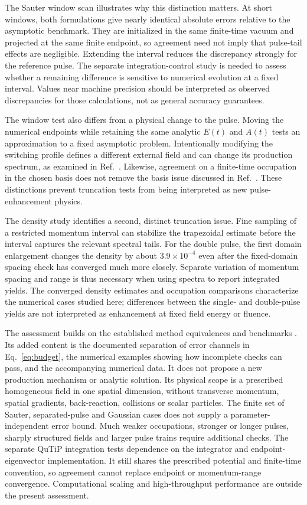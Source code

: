 \documentclass[11pt,a4paper]{article}
\begin{document}
The Sauter window scan illustrates why this distinction matters. At short windows, both formulations give nearly identical absolute errors relative to the asymptotic benchmark. They are initialized in the same finite-time vacuum and projected at the same finite endpoint, so agreement need not imply that pulse-tail effects are negligible. Extending the interval reduces the discrepancy strongly for the reference pulse. The separate integration-control study is needed to assess whether a remaining difference is sensitive to numerical evolution at a fixed interval. Values near machine precision should be interpreted as observed discrepancies for those calculations, not as general accuracy guarantees.

The window test also differs from a physical change to the pulse. Moving the numerical endpoints while retaining the same analytic $E(t)$ and $A(t)$ tests an approximation to a fixed asymptotic problem. Intentionally modifying the switching profile defines a different external field and can change its production spectrum, as examined in Ref.~\cite{Aleksandrov2025}. Likewise, agreement on a finite-time occupation in the chosen basis does not remove the basis issue discussed in Ref.~\cite{Dabrowski2016}. These distinctions prevent truncation tests from being interpreted as new pulse-enhancement physics.

The density study identifies a second, distinct truncation issue. Fine sampling of a restricted momentum interval can stabilize the trapezoidal estimate before the interval captures the relevant spectral tails. For the double pulse, the first domain enlargement changes the density by about $3.9\times10^{-4}$ even after the fixed-domain spacing check has converged much more closely. Separate variation of momentum spacing and range is thus necessary when using spectra to report integrated yields. The converged density estimates and occupation comparisons characterize the numerical cases studied here; differences between the single- and double-pulse yields are not interpreted as enhancement at fixed field energy or fluence.

The assessment builds on the established method equivalences and benchmarks \cite{Dumlu2009,Hebenstreit2010,LiGong2021}. Its added content is the documented separation of error channels in Eq.~\eqref{eq:budget}, the numerical examples showing how incomplete checks can pass, and the accompanying numerical data. It does not propose a new production mechanism or analytic solution. Its physical scope is a prescribed homogeneous field in one spatial dimension, without transverse momentum, spatial gradients, back-reaction, collisions or scalar particles. The finite set of Sauter, separated-pulse and Gaussian cases does not supply a parameter-independent error bound. Much weaker occupations, stronger or longer pulses, sharply structured fields and larger pulse trains require additional checks. The separate QuTiP integration tests dependence on the integrator and endpoint-eigenvector implementation. It still shares the prescribed potential and finite-time convention, so agreement cannot replace endpoint or momentum-range convergence. Computational scaling and high-throughput performance are outside the present assessment.
\end{document}
